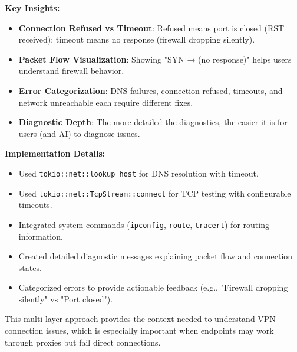 \textbf{Key Insights:}
\begin{itemize}
    \item \textbf{Connection Refused vs Timeout}: Refused means port is closed (RST received); timeout means no response (firewall dropping silently).
    \item \textbf{Packet Flow Visualization}: Showing "SYN → (no response)" helps users understand firewall behavior.
    \item \textbf{Error Categorization}: DNS failures, connection refused, timeouts, and network unreachable each require different fixes.
    \item \textbf{Diagnostic Depth}: The more detailed the diagnostics, the easier it is for users (and AI) to diagnose issues.
\end{itemize}

\textbf{Implementation Details:}
\begin{itemize}
    \item Used \texttt{tokio::net::lookup\_host} for DNS resolution with timeout.
    \item Used \texttt{tokio::net::TcpStream::connect} for TCP testing with configurable timeouts.
    \item Integrated system commands (\texttt{ipconfig}, \texttt{route}, \texttt{tracert}) for routing information.
    \item Created detailed diagnostic messages explaining packet flow and connection states.
    \item Categorized errors to provide actionable feedback (e.g., "Firewall dropping silently" vs "Port closed").
\end{itemize}

This multi-layer approach provides the context needed to understand VPN connection issues, which is especially important when endpoints may work through proxies but fail direct connections.

